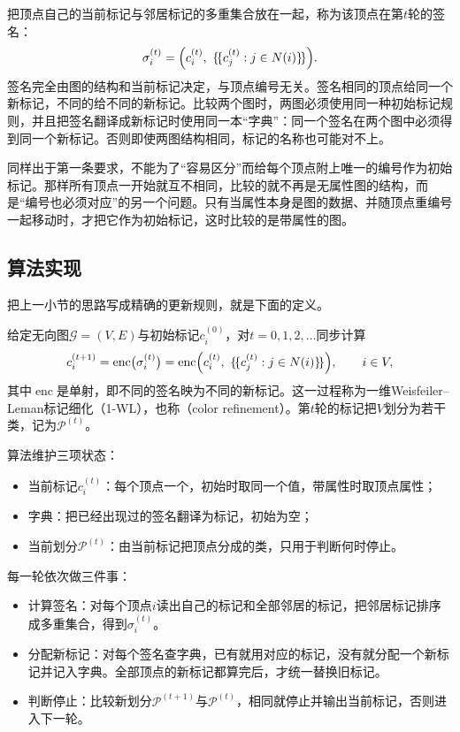 把顶点自己的当前标记与邻居标记的多重集合放在一起，称为该顶点在第$t$轮的签名：
\[
\sigma_i^{(t)}=\Bigl(c_i^{(t)},\ \{\!\{c_j^{(t)}:j\in N(i)\}\!\}\Bigr).
\]
签名完全由图的结构和当前标记决定，与顶点编号无关。签名相同的顶点给同一个新标记，不同的给不同的新标记。比较两个图时，两图必须使用同一种初始标记规则，并且把签名翻译成新标记时使用同一本“字典”：同一个签名在两个图中必须得到同一个新标记。否则即使两图结构相同，标记的名称也可能对不上。

同样出于第一条要求，不能为了“容易区分”而给每个顶点附上唯一的编号作为初始标记。那样所有顶点一开始就互不相同，比较的就不再是无属性图的结构，而是“编号也必须对应”的另一个问题。只有当属性本身是图的数据、并随顶点重编号一起移动时，才把它作为初始标记，这时比较的是带属性的图。

\subsection{算法实现}
\label{sec:graph-trav-wl-algorithm}

把上一小节的思路写成精确的更新规则，就是下面的定义。

\begin{definition}[1-WL标记细化]
\label{def:graph-trav-wl-refinement}
给定无向图$\mathcal G=(V,E)$与初始标记$c_i^{(0)}$，对$t=0,1,2,\ldots$同步计算
\begin{equation}
c_i^{(t+1)}=\operatorname{enc}\bigl(\sigma_i^{(t)}\bigr)
=\operatorname{enc}\Bigl(c_i^{(t)},\ \{\!\{c_j^{(t)}:j\in N(i)\}\!\}\Bigr),
\qquad i\in V,
\label{eq:graph-trav-wl-update}
\end{equation}
其中$\operatorname{enc}$是单射，即不同的签名映为不同的新标记。这一过程称为一维Weisfeiler--Leman标记细化（1-WL），也称（color refinement）。第$t$轮的标记把$V$划分为若干类，记为$\mathcal P^{(t)}$。
\end{definition}

算法维护三项状态：
\begin{itemize}
  \item 当前标记$c_i^{(t)}$：每个顶点一个，初始时取同一个值，带属性时取顶点属性；
  \item 字典：把已经出现过的签名翻译为标记，初始为空；
  \item 当前划分$\mathcal P^{(t)}$：由当前标记把顶点分成的类，只用于判断何时停止。
\end{itemize}

每一轮依次做三件事：
\begin{itemize}
  \item 计算签名：对每个顶点$i$读出自己的标记和全部邻居的标记，把邻居标记排序成多重集合，得到$\sigma_i^{(t)}$。
  \item 分配新标记：对每个签名查字典，已有就用对应的标记，没有就分配一个新标记并记入字典。全部顶点的新标记都算完后，才统一替换旧标记。
  \item 判断停止：比较新划分$\mathcal P^{(t+1)}$与$\mathcal P^{(t)}$，相同就停止并输出当前标记，否则进入下一轮。
\end{itemize}

